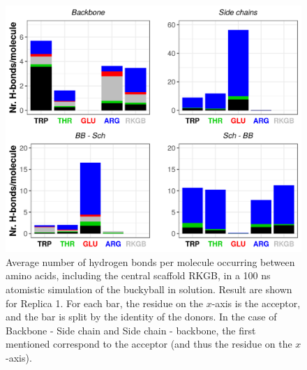 \begin{figure}[t]
\centering
\includegraphics[width=0.85\linewidth]{3results_capsule/pics/Hb_all.png} 
\caption[Hydrogen bonds in the buckyball molecule]{Average number of hydrogen bonds per molecule occurring between amino acids, including the central scaffold RKGB, in a 100 ns atomistic simulation of the buckyball in solution. Result are shown for Replica 1. For each bar, the residue on the $x$-axis is the acceptor, and the bar is split by the identity of the donors. In the case of Backbone - Side chain and Side chain - backbone, the first mentioned correspond to the acceptor (and thus the residue on the $x$-axis).}
\label{fig:BTI_hbonds}
\end{figure}

